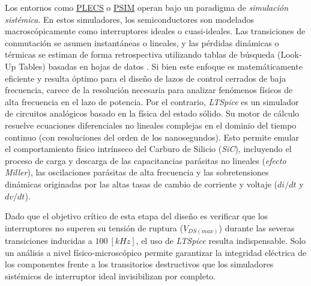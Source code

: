 \documentclass[12pt,a4paper]{article}
\begin{document}
Los entornos como \href{https://www.plexim.com/products/plecs}{PLECS} o \href{https://www.siemens.com/en-us/products/simcenter/systems-simulation/psim/}{PSIM} operan bajo un paradigma de \textit{simulación sistémica}. En estos simuladores, los semiconductores son modelados macroscópicamente como interruptores ideales o cuasi-ideales. Las transiciones de conmutación se asumen instantáneas o lineales, y las pérdidas dinámicas o térmicas se estiman de forma retrospectiva utilizando tablas de búsqueda (Look-Up Tables) basadas en hojas de datos \cite{b21}. Si bien este enfoque es matemáticamente eficiente y resulta óptimo para el diseño de lazos de control cerrados de baja frecuencia, carece de la resolución necesaria para analizar fenómenos físicos de alta frecuencia en el lazo de potencia. Por el contrario, \textit{LTSpice} es un simulador de circuitos analógicos basado en la física del estado sólido. Su motor de cálculo resuelve ecuaciones diferenciales no lineales complejas en el dominio del tiempo continuo (con resoluciones del orden de los nanosegundos). Esto permite emular el comportamiento físico intrínseco del Carburo de Silicio (\textit{SiC}), incluyendo el proceso de carga y descarga de las capacitancias parásitas no lineales (\textit{efecto Miller}), las oscilaciones parásitas de alta frecuencia y las sobretensiones dinámicas originadas por las altas tasas de cambio de corriente y voltaje ($di/dt$ y $dv/dt$).

Dado que el objetivo crítico de esta etapa del diseño es verificar que los interruptores no superen su tensión de ruptura ($V_{DS(max)}$) durante las severas transiciones inducidas a $100 \ [kHz]$, el uso de \textit{LTSpice} resulta indispensable. Solo un análisis a nivel físico-microscópico permite garantizar la integridad eléctrica de los componentes frente a los transitorios destructivos que los simuladores sistémicos de interruptor ideal invisibilizan por completo. \cite{b21}
\end{document}
